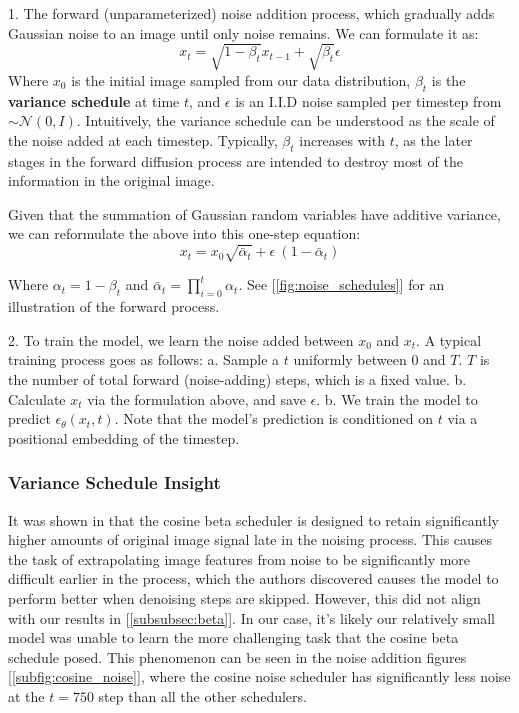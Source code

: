 \documentclass[10pt,twocolumn,letterpaper]{article}
\begin{document}
1. The forward (unparameterized) noise addition process, which gradually adds Gaussian noise to an image until only noise remains. We can formulate it as:
$$x_t = \sqrt{1 - \beta_t} x_{t-1} + \sqrt{\beta_t} \epsilon$$
Where $x_0$ is the initial image sampled from our data distribution, $\beta_t$ is the \textbf{variance schedule} at time $t$, and $\epsilon$ is an I.I.D noise sampled per timestep from $\sim \mathcal{N}(0, I)$. Intuitively, the variance schedule can be understood as the scale of the noise added at each timestep. Typically, $\beta_t$ increases with $t$, as the later stages in the forward diffusion process are intended to destroy most of the information in the original image.

Given that the summation of Gaussian random variables have additive variance, we can reformulate the above into this one-step equation:
$$x_t = x_0 \sqrt{\bar{\alpha}_t} + \epsilon\ (1 - \bar{\alpha}_t)$$

Where $\alpha_t = 1 - \beta_t$ and $\bar{\alpha}_t = \prod_{i=0}^t \alpha_t$. See [\ref{fig:noise_schedules}] for an illustration of the forward process.

\hfill

2. To train the model, we learn the noise added between $x_0$ and $x_t$. A typical training process goes as follows:
a. Sample a $t$ uniformly between $0$ and $T$. $T$ is the number of total forward (noise-adding) steps, which is a fixed value.
b. Calculate $x_t$ via the formulation above, and save $\epsilon$.
b. We train the model to predict $\epsilon_\theta(x_t, t)$. Note that the model's prediction is conditioned on $t$ via a positional embedding of the timestep.


\subsubsection{Variance Schedule Insight}
\label{subsubsec:varschedinsight}
It was shown in \cite{IDDPM} that the cosine beta scheduler is designed to retain significantly higher amounts of original image signal late in the noising process. This causes the task of extrapolating image features from noise to be significantly more difficult earlier in the process, which the authors discovered causes the model to perform better when denoising steps are skipped. However, this did not align with our results in [\ref{subsubsec:beta}]. In our case, it's likely our relatively small model was unable to learn the more challenging task that the cosine beta schedule posed. This phenomenon can be seen in the noise addition figures [\ref{subfig:cosine_noise}], where the cosine noise scheduler has significantly less noise at the $t = 750$ step than all the other schedulers.
\end{document}
